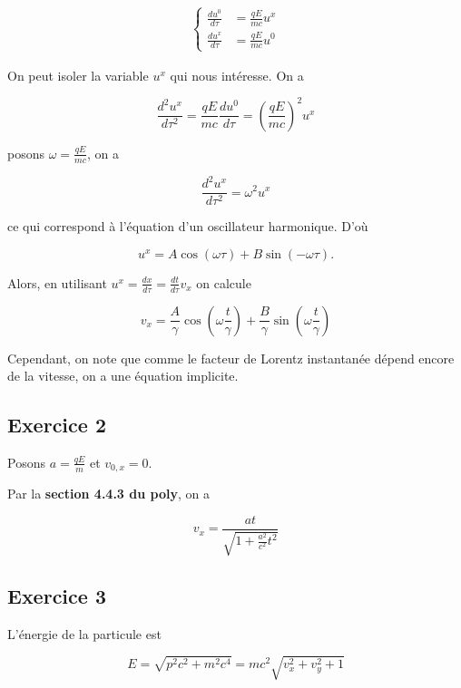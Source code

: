 \documentclass[french]{article}
\begin{document}
	\begin{align}
	\begin{cases}
	\frac{d u^0}{d \tau} &= \frac{qE}{mc} u^x \\
	\frac{d u^x}{d \tau} &= \frac{qE}{mc} u^0 
	\end{cases}
	\end{align}
	
	On peut isoler la variable $u^x$ qui nous intéresse. On a
	
	$$ \frac{d^2 u^x}{d \tau^2} = \frac{qE}{mc} \frac{d u^0}{d \tau} = \left(\frac{qE}{mc}\right)^2 u^x $$
	
	posons $\omega = \frac{qE}{mc}$, on a 
	
	\begin{equation}
		\frac{d^2 u^x}{d \tau^2} = \omega^2 u^x
	\end{equation}
	
	ce qui correspond à l'équation d'un oscillateur harmonique. D'où
	
	\begin{equation}
		u^x = A \cos(\omega \tau) + B \sin(- \omega \tau).
	\end{equation}
	
	Alors, en utilisant $ u^x = \frac{d x}{d \tau} = \frac{d t}{d \tau} v_x $ on calcule
	
	$$ v_x  = \frac{A}{\gamma} \cos\left(\omega \frac{t}{\gamma}\right) + \frac{B}{\gamma} \sin\left(\omega \frac{t}{\gamma}\right)$$
	
	Cependant, on note que comme le facteur de Lorentz instantanée dépend encore de la vitesse, on a une équation implicite.
	
	\subsection*{Exercice 2}
	
	Posons $a = \frac{qE}{m}$ et $v_{0, x} = 0$.
	
	Par la \textbf{section 4.4.3 du poly}, on a
	
	$$ v_x = \frac{at}{\sqrt{1 + \frac{a^2}{c^2}t^2}} $$
	
	\subsection*{Exercice 3}
	
	L'énergie de la particule est
	
	\begin{equation}
		E = \sqrt{p^2c^2 + m^2 c^4} = mc^2 \sqrt{v_x^2 + v_y^2 + 1}
	\end{equation} 
	
	
	
\end{document}
